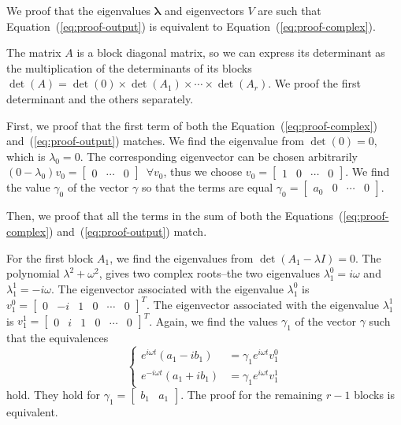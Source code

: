 \documentclass[letterpaper,10pt,conference]{ieeeconf}
\theoremstyle{definition}
\begin{document}
We proof that the eigenvalues $\mathbf{\lambda}$ and eigenvectors $V$ are such that Equation~(\ref{eq:proof-output}) is equivalent to Equation~(\ref{eq:proof-complex}).

The matrix $A$ is a block diagonal matrix, so we can express its determinant as the multiplication of the determinants of its blocks $\det{(A)}=\det{(0)}\times\det{(A_1)}\times\cdots\times\det{(A_r)}$. We proof the first determinant and the others separately.

First, we proof that the first term of both the Equation~(\ref{eq:proof-complex}) and~(\ref{eq:proof-output}) matches. We find the eigenvalue from $\det(0)=0$, which is $\lambda_0=0$. The corresponding eigenvector can be chosen arbitrarily $(0-\lambda_0)v_0=\begin{bmatrix} 0 & \cdots & 0 \end{bmatrix}\,\,\,\forall v_0$, thus we choose $v_0=\begin{bmatrix}1 & 0 & \cdots & 0\end{bmatrix}$. We find the value $\gamma_0$ of the vector $\gamma$ so that the terms are equal $\gamma_0=\begin{bmatrix}a_0 & 0 & \cdots & 0\end{bmatrix}$. 

Then, we proof that all the terms in the sum of both the Equations~(\ref{eq:proof-complex}) and~(\ref{eq:proof-output}) match. 

For the first block $A_1$, we find the eigenvalues from $\det(A_1-\lambda I)=0$. The polynomial $\lambda^2+\omega^2$, gives two complex roots--the two eigenvalues $\lambda_1^0=i\omega$ and $\lambda_1^1=-i\omega$. The eigenvector associated with the eigenvalue $\lambda_1^0$ is $v_1^0=\begin{bmatrix}0 & -i&1&0&\cdots&0\end{bmatrix}^T$. The eigenvector associated with the eigenvalue $\lambda_1^1$ is $v_1^1=\begin{bmatrix}0&i&1&0&\cdots&0\end{bmatrix}^T$. Again, we find the values $\gamma_1$ of the vector $\gamma$ such that the equivalences 
\begin{equation*}\begin{cases}
  e^{i\omega t}(a_1-ib_1)&=\gamma_1 e^{i\omega t}v_1^0\\
  e^{-i\omega t}(a_1+ib_1)&=\gamma_1 e^{i\omega t}v_1^1
\end{cases}\end{equation*}
hold. They hold for $\gamma_1=\begin{bmatrix}b_1&a_1\end{bmatrix}$. The proof for the remaining $r-1$ blocks is equivalent.
\end{document}
